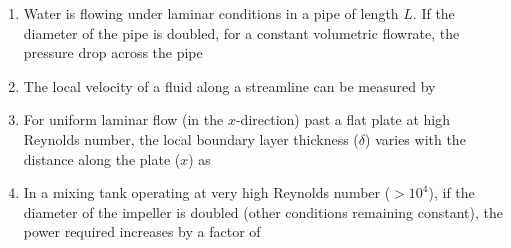 \documentclass[journal,12pt,onecolumn]{IEEEtran}
\theoremstyle{remark}
\begin{document}
\begin{enumerate}
\item Water is flowing under laminar conditions in a pipe of length $L$. If the diameter of the pipe is doubled, for a constant volumetric flowrate, the pressure drop across the pipe
\hfill{}
\begin{enumerate}
\end{enumerate}

\item The local velocity of a fluid along a streamline can be measured by
\hfill{}
\begin{enumerate}
\end{enumerate}

    \item For uniform laminar flow (in the $x$-direction) past a flat plate at high Reynolds number, the local boundary layer thickness ($\delta$) varies with the distance along the plate ($x$) as
    \hfill{}
    \begin{enumerate}
  \end{enumerate}

    \item In a mixing tank operating at very high Reynolds number ($> 10^4$), if the diameter of the impeller is doubled (other conditions remaining constant), the power required increases by a factor of
    \hfill{}
    \begin{enumerate}
    \end{enumerate}


\end{enumerate}
\end{document}
